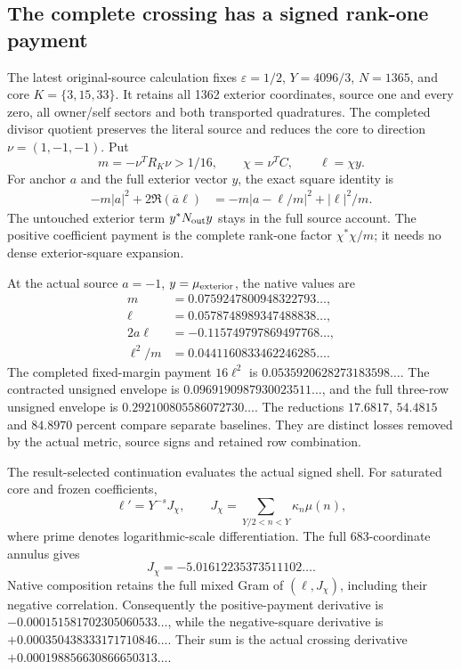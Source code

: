\subsection{The complete crossing has a signed rank-one payment}

The latest original-source calculation fixes
\(\varepsilon=1/2\), \(Y=4096/3\), \(N=1365\), and core
\(K=\{3,15,33\}\). It retains all 1362 exterior coordinates,
source one and every zero, all owner/self sectors and both
transported quadratures. The completed divisor quotient preserves
the literal source and reduces the core to direction
\(\nu=(1,-1,-1)\). Put
\[
 m=-\nu^TR_K\nu>1/16,\qquad
 \chi=\nu^TC,\qquad \ell=\chi y.
\]
For anchor \(a\) and the full exterior vector \(y\), the exact square
identity is
\[
\begin{aligned}
 -m|a|^2+2\Re(\overline a\ell)
 &=-m|a-\ell/m|^2+|\ell|^2/m.
\end{aligned}
\]
The untouched exterior term \(y^*N_{\rm out}y\) stays in the full
source account. The positive coefficient payment is the complete
rank-one factor \(\chi^*\chi/m\); it needs no dense exterior-square
expansion.

At the actual source \(a=-1\), \(y=\mu_{\rm exterior}\), the native
values are
\[
\begin{aligned}
 m&=0.0759247800948322793\ldots,\\
 \ell&=0.0578748989347488838\ldots,\\
 2a\ell&=-0.115749797869497768\ldots,\\
 \ell^2/m&=0.0441160833462246285\ldots.
\end{aligned}
\]
The completed fixed-margin payment \(16\ell^2\) is
\(0.0535920628273183598\ldots\). The contracted unsigned envelope
is \(0.0969190987930023511\ldots\), and the full three-row
unsigned envelope is \(0.292100805586072730\ldots\).
The reductions \(17.6817\), \(54.4815\) and \(84.8970\) percent
compare separate baselines. They are distinct losses removed by the
actual metric, source signs and retained row combination.

The result-selected continuation evaluates the actual signed shell.
For saturated core and frozen coefficients,
\[
 \ell'=Y^{-s}J_\chi,\qquad
 J_\chi=\sum_{Y/2<n<Y}\kappa_n\mu(n),
\]
where prime denotes logarithmic-scale differentiation. The full
683-coordinate annulus gives
\[
 J_\chi=-5.01612235373511102\ldots.
\]
Native composition retains the full mixed Gram of
\((\ell,J_\chi)\), including their negative correlation.
Consequently the positive-payment derivative is
\(-0.000151581702305060533\ldots\), while the negative-square
derivative is \(+0.000350438333171710846\ldots\).
Their sum is the actual crossing derivative
\(+0.000198856630866650313\ldots\).

